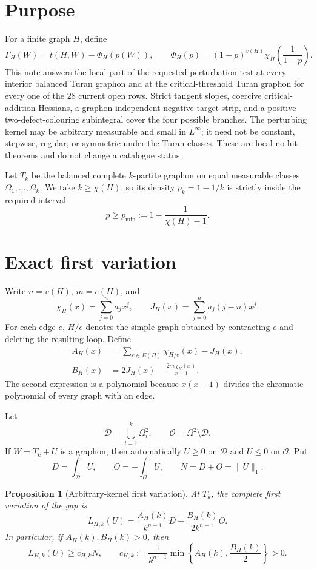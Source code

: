 \documentclass[11pt]{article}
\newtheorem{proposition}[theorem]{Proposition}
\begin{document}
\section{Purpose}

For a finite graph $H$, define
\[
 \Gamma_H(W)=t(H,W)-\Phi_H(p(W)),
 \qquad
 \Phi_H(p)=(1-p)^{v(H)}
 \chi_H\!\left(\frac1{1-p}\right).
\]
This note answers the local part of the requested perturbation test at every
interior balanced Turan graphon and at the critical-threshold Turan graphon
for every one of the $28$ current open rows.  Strict tangent slopes,
coercive critical-addition Hessians, a graphon-independent negative-target
strip, and a positive two-defect-colouring subintegral cover the four
possible branches.  The perturbing kernel may be arbitrary measurable and
small in $L^\infty$; it need not be constant, stepwise, regular, or symmetric
under the Turan classes.  These are local no-hit theorems and do not change a
catalogue status.

Let $T_k$ be the balanced complete $k$-partite graphon on equal measurable
classes $\Omega_1,\ldots,\Omega_k$.  We take $k\geq\chi(H)$, so its density
$p_k=1-1/k$ is strictly inside the required interval
\[
 p\geq p_{\min}:=1-\frac1{\chi(H)-1}.
\]

\section{Exact first variation}

Write $n=v(H)$, $m=e(H)$, and
\[
 \chi_H(x)=\sum_{j=0}^n a_jx^j,
 \qquad
 J_H(x)=\sum_{j=0}^n a_j(j-n)x^j.
\]
For each edge $e$, $H/e$ denotes the simple graph obtained by contracting
$e$ and deleting the resulting loop.  Define
\begin{align}
 A_H(x)&=\sum_{e\in E(H)}\chi_{H/e}(x)-J_H(x),
 \label{eq:A}\\
 B_H(x)&=2J_H(x)-\frac{2m\chi_H(x)}{x-1}.
 \label{eq:B}
\end{align}
The second expression is a polynomial because $x(x-1)$ divides the
chromatic polynomial of every graph with an edge.

Let
\[
 \mathcal D=\bigcup_{i=1}^k\Omega_i^2,
 \qquad
 \mathcal O=\Omega^2\setminus\mathcal D.
\]
If $W=T_k+U$ is a graphon, then automatically $U\geq0$ on $\mathcal D$ and
$U\leq0$ on $\mathcal O$.  Put
\[
 D=\int_{\mathcal D}U,
 \qquad O=-\int_{\mathcal O}U,
 \qquad N=D+O=\lVert U\rVert_1.
\]

\begin{proposition}[Arbitrary-kernel first variation]
\label{prop:first}
At $T_k$, the complete first variation of the gap is
\begin{equation}
 L_{H,k}(U)=
 \frac{A_H(k)}{k^{n-1}}D
 +\frac{B_H(k)}{2k^{n-1}}O.
 \label{eq:first}
\end{equation}
In particular, if $A_H(k),B_H(k)>0$, then
\begin{equation}
 L_{H,k}(U)\geq c_{H,k}N,
 \qquad
 c_{H,k}:=\frac1{k^{n-1}}
 \min\left\{A_H(k),\frac{B_H(k)}2\right\}>0.
 \label{eq:slope}
\end{equation}
\end{proposition}
\end{document}
